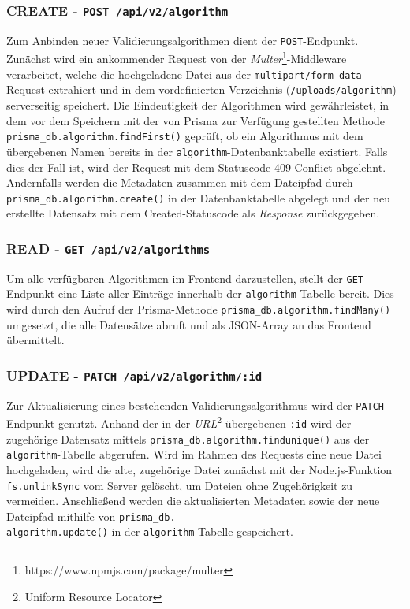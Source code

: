 \subsubsection*{CREATE - \texttt{POST /api/v2/algorithm}}

Zum Anbinden neuer Validierungsalgorithmen dient der \texttt{POST}-Endpunkt. Zunächst wird ein ankommender Request von der \textit{Multer}\footnote{https://www.npmjs.com/package/multer}-Middleware verarbeitet, welche die hochgeladene Datei aus der \texttt{multipart/form-data}-Request extrahiert und in dem vordefinierten Verzeichnis (\texttt{/uploads/algorithm}) serverseitig speichert. Die Eindeutigkeit der Algorithmen wird gewährleistet, in dem vor dem Speichern mit der von Prisma zur Verfügung gestellten Methode \texttt{prisma\_db.algorithm.findFirst()} geprüft, ob ein Algorithmus mit dem übergebenen Namen bereits in der \texttt{algorithm}-Datenbanktabelle existiert. Falls dies der Fall ist, wird der Request mit dem Statuscode 409 Conflict abgelehnt. Andernfalls werden die Metadaten zusammen mit dem Dateipfad durch \texttt{prisma\_db.algorithm.create()} in der Datenbanktabelle abgelegt und der neu erstellte Datensatz mit dem Created-Statuscode als \textit{Response} zurückgegeben.

\subsubsection*{READ - \texttt{GET /api/v2/algorithms}}

Um alle verfügbaren Algorithmen im Frontend darzustellen, stellt der \texttt{GET}-Endpunkt eine Liste aller Einträge innerhalb der \texttt{algorithm}-Tabelle bereit. Dies wird durch den Aufruf der Prisma-Methode \texttt{prisma\_db.algorithm.findMany()} umgesetzt, die alle Datensätze abruft und als JSON-Array an das Frontend übermittelt.

\subsubsection*{UPDATE - \texttt{PATCH /api/v2/algorithm/:id}}

Zur Aktualisierung eines bestehenden Validierungsalgorithmus wird der \texttt{PATCH}-Endpunkt genutzt. Anhand der in der \textit{URL}\footnote{Uniform Resource Locator} übergebenen \texttt{:id} wird der zugehörige Datensatz mittels \texttt{prisma\_db.algorithm.findunique()} aus der \texttt{algorithm}-Tabelle abgerufen. Wird im Rahmen des Requests eine neue Datei hochgeladen, wird die alte, zugehörige Datei zunächst mit der Node.js-Funktion \texttt{fs.unlinkSync} vom Server gelöscht, um Dateien ohne Zugehörigkeit zu vermeiden. Anschließend werden die aktualisierten Metadaten sowie der neue Dateipfad mithilfe von \texttt{prisma\_db.\\ algorithm.update()} in der \texttt{algorithm}-Tabelle gespeichert.

